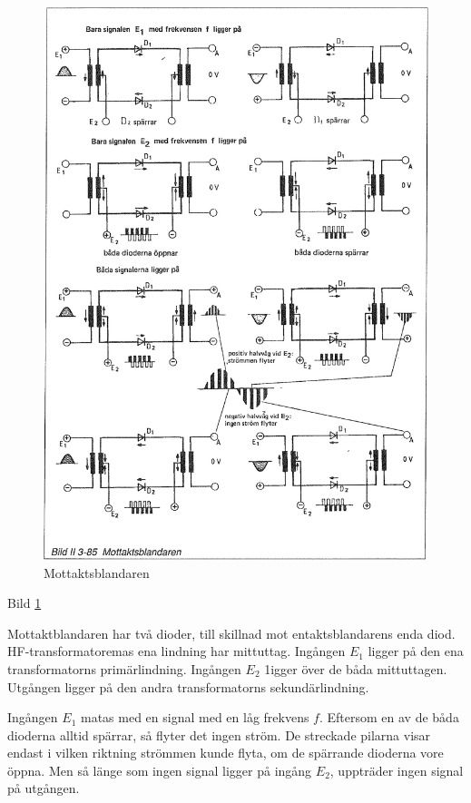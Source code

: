 \begin{figure}
\includegraphics[width=\textwidth]{images/bild_2_3-85}
\caption{Mottaktsblandaren}
\label{fig:BildII3-85}
\end{figure}

Bild \ref{fig:BildII3-85}

Mottaktblandaren har två dioder, till skillnad mot entaktsblandarens
enda diod. HF-transformatoremas ena lindning har mittuttag.  Ingången
\(E_1\) ligger på den ena transformatorns primärlindning. Ingången
\(E_2\) 1igger över de båda mittuttagen. Utgången ligger på den andra
transformatorns sekundärlindning.

Ingången \(E_1\) matas med en signal med en låg frekvens
\(f\). Eftersom en av de båda dioderna alltid spärrar, så flyter det
ingen ström. De streckade pilarna visar endast i vilken riktning
strömmen kunde flyta, om de spärrande dioderna vore öppna. Men så
länge som ingen signal ligger på ingång \(E_2\), uppträder ingen
signal på utgången.

